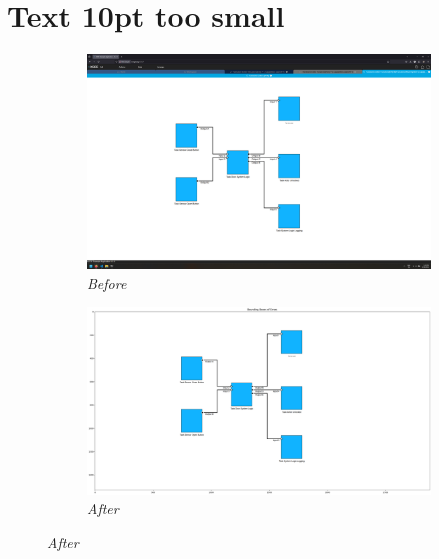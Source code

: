 \documentclass{article}
\begin{document}
\section{Text 10pt too small}
\begin{figure}[H]
    \centering
    \begin{subfigure}[t]{0.9\textwidth}
        \centering
        \includegraphics[width=\textwidth]{testcases/text_10pt_too_small/154344-435789_input_image.png}
        \caption*{\textit{Before}}
    \end{subfigure}
    \newline
    \begin{subfigure}[t]{0.9\textwidth}
        \centering
        \includegraphics[width=\textwidth]{testcases/text_10pt_too_small/154357-030783_element_bbox_errors_labeled_colored.png}
        \caption*{\textit{After}}
    \end{subfigure}
    \label{fig:text_too_small_10}
\end{figure}
\newpage
\end{document}
